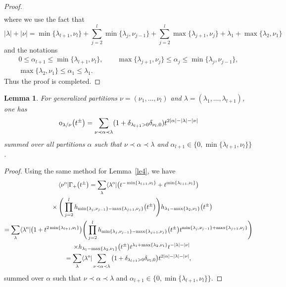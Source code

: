 \documentclass[10pt,a4paper]{amsart}
\numberwithin{equation}{section}
\newtheorem{Lemma}[Theorem]{Lemma}
\begin{document}
\begin{proof}
\begin{gather*}
\end{gather*}
 where we use the fact that \[
 |\lambda|+|\nu|=\min\{\lambda_{l+1},\nu_l\}+\sum^l_{j=2}\min\{\lambda_j,\nu_{j-1}\}+\sum^l_{j=2}\max\{\lambda_{j+1},\nu_j\}+\lambda_1+\max\{\lambda_2,\nu_1\}
 \] and the notations
\begin{gather*}
 0\leq \alpha_{l+1}\leq\min\{\lambda_{l+1},\nu_l\}, \qquad \max\{\lambda_{j+1},\nu_j\}\leq \alpha_{j}\leq\min\{\lambda_j,\nu_{j-1}\},\\ \max\{\lambda_2,\nu_1\}\leq\alpha_1\leq \lambda_1.
\end{gather*}
Thus the proof is completed.
\end{proof}

\begin{Lemma}\label{le2}
For generalized partitions $\nu=(\nu_{1},\dots,\nu_{l})$ and $\lambda=(\lambda_{1},\dots,\lambda_{l+1})$, one has
\begin{align*}
{\rm o}_{\lambda/\nu}\big(t^{\pm}\big)=\sum_{\nu\prec\alpha\prec\lambda}(1+\delta_{\lambda_{l+1}>0}\delta_{\nu_{l},0})t^{2|\alpha|-|\lambda|-|\nu|}
\end{align*}
summed over all partitions $\alpha$ such that $\nu\prec\alpha\prec\lambda$ and $\alpha_{l+1}\in \{0,\min\{\lambda_{l+1},\nu_{l}\}\}$.
\end{Lemma}
\begin{proof}
Using the same method for Lemma~\ref{le4}, we have
\begin{gather*}
 \langle\nu^{\rm o}|\Gamma_+\big(t^{\pm}\big) =\sum_{\lambda}\langle\lambda^{\rm o}|\big(t^{-\min\{\lambda_{l+1},\nu_l\}}+t^{\min\{\lambda_{l+1},\nu_l\}}\big)\\
 \quad{}\times\Bigg(\prod^{l}_{j=2}h_{\min\{\lambda_j,\nu_{j-1}\}-\max\{\lambda_{j+1},\nu_j\}}\big(t^{\pm}\big)\Bigg)
 h_{\lambda_1-\max\{\lambda_2,\nu_1\}}\big(t^{\pm}\big)
\\
 = \sum_{\lambda}\langle\lambda^{\rm o}|\big(1+t^{2\min\{\lambda_{l+1},\nu_l\}}\big) \Bigg(\prod^{l}_{j=2}h_{\min\{\lambda_j,\nu_{j-1}\}-\max\{\lambda_{j+1},\nu_j\}}\big(t^{\pm}\big)t^{\min\{\lambda_j,\nu_{j-1}\}+\max\{\lambda_{j+1},\nu_j\}}\Bigg)\\
 \quad\times h_{\lambda_1-\max\{\lambda_2,\nu_1\}}\big(t^{\pm}\big)t^{\lambda_1+\max\{\lambda_2,\nu_1\}} t^{-|\lambda|-|\nu|}\\
= \sum_{\lambda}\langle\lambda^{\rm o}|\sum_{\nu\prec\alpha\prec\lambda}\big(1+\delta_{\lambda_{l+1}>0}\delta_{\nu_{l},0}\big)t^{2|\alpha|-|\lambda|-|\nu|},
\end{gather*}
summed over $\alpha$ such that $\nu\prec\alpha\prec\lambda$ and $\alpha_{l+1}\in \{0,\min\{\lambda_{l+1},\nu_{l}\}\}$.
\end{proof}
\end{document}
